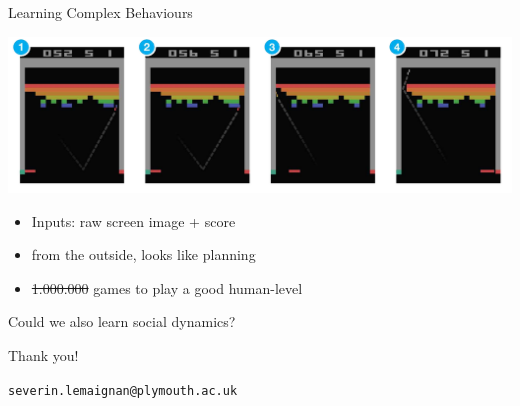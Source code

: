 \documentclass[compress]{beamer}
\begin{document}
{
\begin{frame}{Learning Complex Behaviours}

    \begin{center}
        \includegraphics[width=\linewidth]{breakout}
    \end{center}


        \begin{itemize}
            \item Inputs: raw screen image + score
            \item from the outside, looks like planning
            \item<2-> \sout{1.000.000} {} games to play a good human-level
        \end{itemize}

     {
        \begin{center}
            {\Medium Could we also learn social dynamics?}
        \end{center}
    }
\end{frame}
}




{
\begin{frame}[plain]{}

    {\Medium Thank you!}

    {\Medium\tt\scriptsize severin.lemaignan@plymouth.ac.uk}

\end{frame}
}
\end{document}

